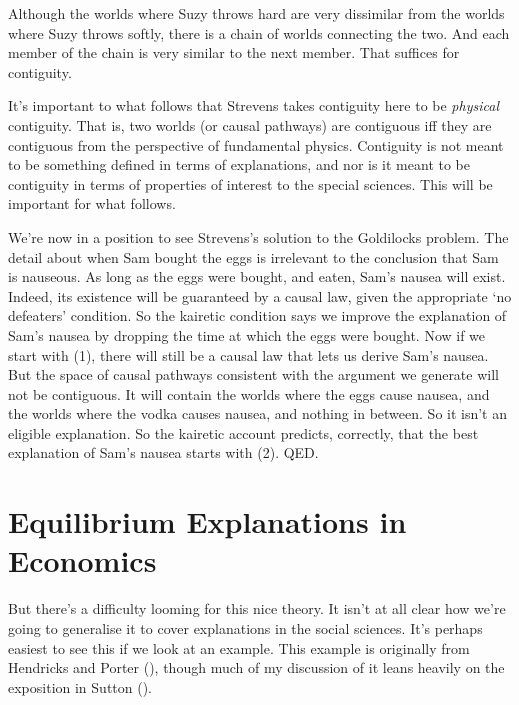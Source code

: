 \documentclass[
  11pt,
  letterpaper,
  DIV=11,
  numbers=noendperiod,
  oneside]{scrartcl}
\begin{document}
Although the worlds where Suzy throws hard are very dissimilar from the
worlds where Suzy throws softly, there is a chain of worlds connecting
the two. And each member of the chain is very similar to the next
member. That suffices for contiguity.

It's important to what follows that Strevens takes contiguity here to be
\emph{physical} contiguity. That is, two worlds (or causal pathways) are
contiguous iff they are contiguous from the perspective of fundamental
physics. Contiguity is not meant to be something defined in terms of
explanations, and nor is it meant to be contiguity in terms of
properties of interest to the special sciences. This will be important
for what follows.

We're now in a position to see Strevens's solution to the Goldilocks
problem. The detail about when Sam bought the eggs is irrelevant to the
conclusion that Sam is nauseous. As long as the eggs were bought, and
eaten, Sam's nausea will exist. Indeed, its existence will be guaranteed
by a causal law, given the appropriate `no defeaters' condition. So the
kairetic condition says we improve the explanation of Sam's nausea by
dropping the time at which the eggs were bought. Now if we start
with (1), there will still be a causal law that lets us derive Sam's
nausea. But the space of causal pathways consistent with the argument we
generate will not be contiguous. It will contain the worlds where the
eggs cause nausea, and the worlds where the vodka causes nausea, and
nothing in between. So it isn't an eligible explanation. So the kairetic
account predicts, correctly, that the best explanation of Sam's nausea
starts with (2). QED.

\section{Equilibrium Explanations in
Economics}\label{equilibrium-explanations-in-economics}

But there's a difficulty looming for this nice theory. It isn't at all
clear how we're going to generalise it to cover explanations in the
social sciences. It's perhaps easiest to see this if we look at an
example. This example is originally from Hendricks and Porter
(), though much of my discussion
of it leans heavily on the exposition in Sutton
().
\end{document}
